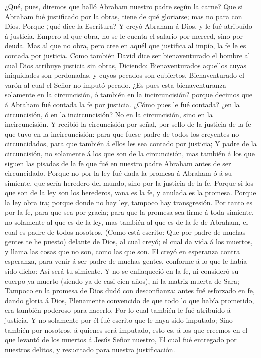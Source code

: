  ¿Qué, pues, diremos que halló Abraham nuestro padre según
la carne?  Que si Abraham fué justificado por la obras,
tiene de qué gloriarse; mas no para con Dios.  Porque ¿qué
dice la Escritura? Y creyó Abraham á Dios, y le fué atribuído á
justicia.  Empero al que obra, no se le cuenta el salario
por merced, sino por deuda.  Mas al que no obra, pero cree
en aquél que justifica al impío, la fe le es contada por justicia.
 Como también David dice ser bienaventurado el hombre al
cual Dios atribuye justicia sin obras,  Diciendo:
Bienaventurados aquellos cuyas iniquidades son perdonadas, y cuyos
pecados son cubiertos.  Bienaventurado el varón al cual el
Señor no imputó pecado.  ¿Es pues esta bienaventuranza
solamente en la circuncisión, ó también en la incircuncisión? porque
decimos que á Abraham fué contada la fe por justicia. 
¿Cómo pues le fué contada? ¿en la circuncisión, ó en la incircuncisión?
No en la circuncisión, sino en la incircuncisión.  Y
recibió la circuncisión por señal, por sello de la justicia de la fe que
tuvo en la incircuncisión: para que fuese padre de todos los creyentes
no circuncidados, para que también á ellos les sea contado por justicia;
 Y padre de la circuncisión, no solamente á los que son
de la circuncisión, mas también á los que siguen las pisadas de la fe
que fué en nuestro padre Abraham antes de ser circuncidado.
 Porque no por la ley fué dada la promesa á Abraham ó á
su simiente, que sería heredero del mundo, sino por la justicia de la
fe.  Porque si los que son de la ley son los herederos,
vana es la fe, y anulada es la promesa.  Porque la ley
obra ira; porque donde no hay ley, tampoco hay transgresión.
 Por tanto es por la fe, para que sea por gracia; para
que la promesa sea firme á toda simiente, no solamente al que es de la
ley, mas también al que es de la fe de Abraham, el cual es padre de
todos nosotros,  (Como está escrito: Que por padre de
muchas gentes te he puesto) delante de Dios, al cual creyó; el cual da
vida á los muertos, y llama las cosas que no son, como las que son.
 El creyó en esperanza contra esperanza, para venir á ser
padre de muchas gentes, conforme á lo que le había sido dicho: Así será
tu simiente.  Y no se enflaqueció en la fe, ni consideró
su cuerpo ya muerto (siendo ya de casi cien años), ni la matriz muerta
de Sara;  Tampoco en la promesa de Dios dudó con
desconfianza: antes fué esforzado en fe, dando gloria á Dios,
 Plenamente convencido de que todo lo que había
prometido, era también poderoso para hacerlo.  Por lo
cual también le fué atribuído á justicia.  Y no solamente
por él fué escrito que le haya sido imputado;  Sino
también por nosotros, á quienes será imputado, esto es, á los que
creemos en el que levantó de los muertos á Jesús Señor nuestro,
 El cual fué entregado por nuestros delitos, y resucitado
para nuestra justificación.

